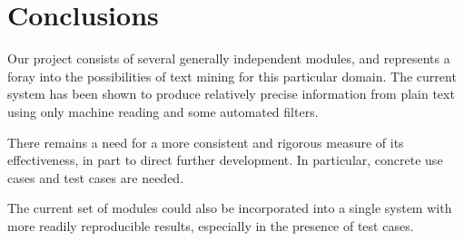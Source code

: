 \documentclass[12pt,letterpaper]{article}
\begin{document}
\section{Conclusions}

Our project consists of several generally independent modules, and represents a foray into the possibilities of text mining for this particular domain. The current system has been shown to produce relatively precise information from plain text using only machine reading and some automated filters.

There remains a need for a more consistent and rigorous measure of its effectiveness, in part to direct further development. In particular, concrete use cases and test cases are needed.

The current set of modules could also be incorporated into a single system with more readily reproducible results, especially in the presence of test cases. 



\end{document}
